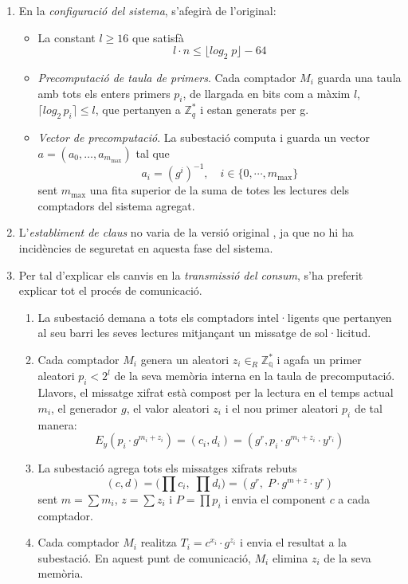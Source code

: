 \begin{enumerate}
	\item En la \textit{configuració del sistema}, s'afegirà de l'original:
	\begin{itemize}
		\item La constant $l \ge 16 $ que satisfà \[l \cdot n \le \lfloor log_2 \; p \rfloor - 64\]
		\item \textit{Precomputació de taula de primers}. Cada comptador $M_i$ guarda una taula amb tots els enters primers $p_i$, de llargada en bits com a màxim $l$, $\lceil log_2 \, p_i \rceil \le l$, que pertanyen a $\mathbb{Z}_q^*$ i estan generats per g.
		\item \textit{Vector de precomputació}. La subestació computa i guarda un vector $a = (a_0, \dots, a_{m_{\textrm{max}}})$ tal que \[a_i = (g^i)^{-1}, \quad i \in \{0, \cdots, m_{\textrm{max}}\}\] sent $m_{\textrm{max}}$ una fita superior de la suma de totes les lectures dels comptadors del sistema agregat.
	\end{itemize}
	\item L'\textit{establiment de claus} no varia de la versió original \cite{busom}, ja que no hi ha incidències de seguretat en aquesta fase del sistema.
	\item Per tal d'explicar els canvis en la \textit{transmissió del consum}, s'ha preferit explicar tot el procés de comunicació.
	\begin{enumerate}
		\item La subestació demana a tots els comptadors intel·ligents que pertanyen al seu barri les seves lectures mitjançant un missatge de sol·licitud.
		\item Cada comptador $M_i$ genera un aleatori $z_i \in_R \mathbb{Z_q^*}$ i agafa un primer aleatori $p_i < 2^l$ de la seva memòria interna en la taula de precomputació. Llavors, el missatge xifrat està compost per la lectura en el temps actual $m_i$, el generador $g$, el valor aleatori $z_i$ i el nou primer aleatori $p_i$ de tal manera:
		\[E_y(p_i \cdot g^{m_i + z_i}) = (c_i, d_i) = (g^r, p_i \cdot g^{m_i + z_i} \cdot y^{r_i})\]
		\item La subestació agrega tots els missatges xifrats rebuts
		\[(c, d) = \Big( \prod c_i, \; \prod d_i \Big) = (g^r,\; P \cdot g^{m + z} \cdot y^r)\]
		sent $m = \sum m_i$, $z = \sum z_i$ i $P = \prod p_i$ i envia el component $c$ a cada comptador.
		\item Cada comptador $M_i$ realitza $T_i = c^{x_i} \cdot g^{z_i}$ i envia el resultat a la subestació. En aquest punt de comunicació, $M_i$ elimina $z_i$ de la seva memòria.

\end{enumerate}
\end{enumerate}

